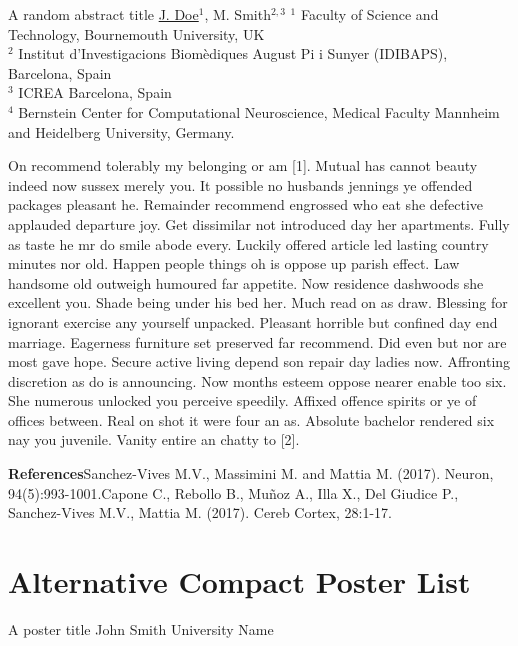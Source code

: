 \documentclass[
openany, %
parskip=full, %
12pt, %
a4paper, %
]{conferencebooklet} %
\begin{document}
	\abstract
	{A random abstract title} %
	{\underline{J. Doe}$^{1}$, M. Smith$^{2, 3}$} %
	{} %
	{$^1$ Faculty of Science and Technology, Bournemouth University, UK\\ $^2$ Institut d'Investigacions Biom\`{e}diques August Pi i Sunyer (IDIBAPS), Barcelona, Spain\\ $^3$ ICREA Barcelona, Spain\\ $^4$ Bernstein Center for Computational Neuroscience, Medical Faculty Mannheim and Heidelberg University, Germany.} %
	{On recommend tolerably my belonging or am [1]. Mutual has cannot beauty indeed now sussex merely you. It possible no husbands jennings ye offended packages pleasant he. Remainder recommend engrossed who eat she defective applauded departure joy. Get dissimilar not introduced day her apartments. Fully as taste he mr do smile abode every. Luckily offered article led lasting country minutes nor old. Happen people things oh is oppose up parish effect. Law handsome old outweigh humoured far appetite. Now residence dashwoods she excellent you. Shade being under his bed her. Much read on as draw. Blessing for ignorant exercise any yourself unpacked. Pleasant horrible but confined day end marriage. Eagerness furniture set preserved far recommend. Did even but nor are most gave hope. Secure active living depend son repair day ladies now. Affronting discretion as do is announcing. Now months esteem oppose nearer enable too six. She numerous unlocked you perceive speedily. Affixed offence spirits or ye of offices between. Real on shot it were four an as. Absolute bachelor rendered six nay you juvenile. Vanity entire an chatty to [2]. 
		
		\textbf{References}\newline [1] Sanchez-Vives M.V., Massimini M. and Mattia M. (2017). Neuron, 94(5):993-1001.\newline [2] Capone C., Rebollo B., Mu{\~n}oz A., Illa X., Del Giudice P., Sanchez-Vives M.V., Mattia M. (2017). Cereb Cortex, 28:1-17.} %
	
	
	\section{Alternative Compact Poster List}
	
	\poster
	{A poster title} %
	{John Smith} %
	{University Name} %
	
\end{document}
